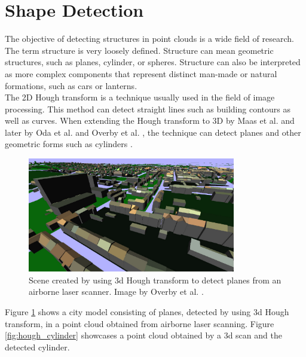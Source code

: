 \section {Shape Detection}
\label{sec:related_work_shape detection}

The objective of detecting structures in point clouds is a wide field of research. The term structure is very loosely defined. Structure can mean geometric structures, such as planes, cylinder, or spheres. Structure can also be interpreted as more complex components that represent distinct man-made or natural formations, such as cars or lanterns. 
\\
The 2D Hough transform \cite{hough1962method} is a technique usually used in the field of image processing. This method can detect straight lines such as building contours as well as curves. When extending the Hough transform to 3D by Maas et al. \cite{maas1999two} and later by Oda et al. \cite{oda2004automatic} and Overby et al. \cite{overby2004automatic}, the technique can detect planes and other geometric forms such as cylinders \cite{rabbani2005efficient}. 

\begin{figure}
    \centering
    \includegraphics[width=0.81\textwidth]{Related_Work/hough_planes.png}%
    \caption{Scene created by using 3d Hough transform to detect planes from an airborne laser scanner. Image by Overby et al. \cite{overby2004automatic}.}
    \label{fig:hough_planes}
\end{figure}

Figure \ref{fig:hough_planes} shows a city model consisting of planes, detected by using 3d Hough transform, in a point cloud obtained from airborne laser scanning. Figure \ref{fig:hough_cylinder} showcases a point cloud obtained by a 3d scan and the detected cylinder. 

